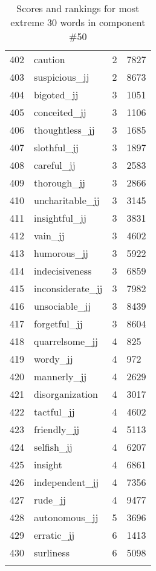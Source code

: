 \begin{longtable}[!htbp]{| rlr@{.}l |}
    402 & caution & 2 & 7827 \\
    403 & suspicious\_jj & 2 & 8673 \\
    404 & bigoted\_jj & 3 & 1051 \\
    405 & conceited\_jj & 3 & 1106 \\
    406 & thoughtless\_jj & 3 & 1685 \\
    407 & slothful\_jj & 3 & 1897 \\
    408 & careful\_jj & 3 & 2583 \\
    409 & thorough\_jj & 3 & 2866 \\
    410 & uncharitable\_jj & 3 & 3145 \\
    411 & insightful\_jj & 3 & 3831 \\
    412 & vain\_jj & 3 & 4602 \\
    413 & humorous\_jj & 3 & 5922 \\
    414 & indecisiveness & 3 & 6859 \\
    415 & inconsiderate\_jj & 3 & 7982 \\
    416 & unsociable\_jj & 3 & 8439 \\
    417 & forgetful\_jj & 3 & 8604 \\
    418 & quarrelsome\_jj & 4 & 825 \\
    419 & wordy\_jj & 4 & 972 \\
    420 & mannerly\_jj & 4 & 2629 \\
    421 & disorganization & 4 & 3017 \\
    422 & tactful\_jj & 4 & 4602 \\
    423 & friendly\_jj & 4 & 5113 \\
    424 & selfish\_jj & 4 & 6207 \\
    425 & insight & 4 & 6861 \\
    426 & independent\_jj & 4 & 7356 \\
    427 & rude\_jj & 4 & 9477 \\
    428 & autonomous\_jj & 5 & 3696 \\
    429 & erratic\_jj & 6 & 1413 \\
    430 & surliness & 6 & 5098 \\
    \hline
    \caption{Scores and rankings for most extreme 30 words in component \#50} \\
\end{longtable}
